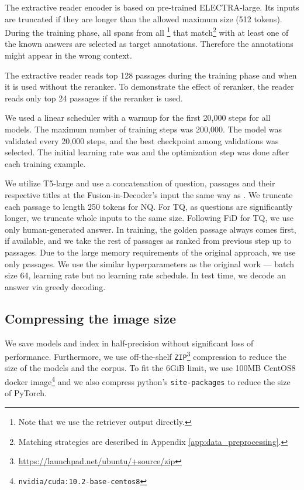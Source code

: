 \documentclass[11pt,a4paper]{article}
\begin{document}
\begin{description}[style=unboxed,leftmargin=0em,listparindent=\parindent]
\item[Extractive reader.] The extractive reader encoder is based on pre-trained ELECTRA-large. 
Its inputs are truncated if they are longer than the allowed maximum size (512 tokens). 
During the training phase, all spans from all \footnote{Note that we use the retriever output directly.} that match\footnote{Matching strategies are described in Appendix \ref{app:data_preprocessing}.} with at least one of the known answers are selected as target annotations. 
Therefore the annotations might appear in the wrong context.

The extractive reader reads top 128 passages during the training phase and when it is used without the reranker. 
To demonstrate the effect of reranker, the reader reads only top 24 passages if the reranker is used.

We used a linear scheduler with a warmup for the first 20,000 steps for all models. 
The maximum number of training steps was 200,000. 
The model was validated every 20,000 steps, and the best checkpoint among validations was selected. 
The initial learning rate was  and the optimization step was done after each training example.

\item[Generative reader.]
We utilize T5-large \cite{raffel2020exploring} and use a concatenation of question, passages and their respective titles at the Fusion-in-Decoder's input the same way as \citet{izacard2020distilling}.  
We truncate each passage to length 250 tokens for NQ. 
For TQ, as questions are significantly longer, we truncate whole inputs to the same size.
Following FiD for TQ, we use only human-generated answer. 
In training, the golden passage always comes first, if available, and we take the rest of passages as ranked from previous step up to  passages.
Due to the large memory requirements of the original approach, we use only  passages. 
We use the similar hyperparameters as the original work --- batch size 64, learning rate  but no learning rate schedule. 
In test time, we decode an answer via greedy decoding.
\end{description}

\subsection{Compressing the image size}
We save models and index in half-precision without significant loss of performance. Furthermore, we use off-the-shelf \texttt{ZIP}\footnote{\url{https://launchpad.net/ubuntu/+source/zip}} compression to reduce the size of the models and the corpus.
To fit the 6GiB limit, we use 100MB CentOS8 docker image\footnote{\texttt{nvidia/cuda:10.2-base-centos8}} and we also compress python's \texttt{site-packages} to reduce the size of PyTorch.
\end{document}
